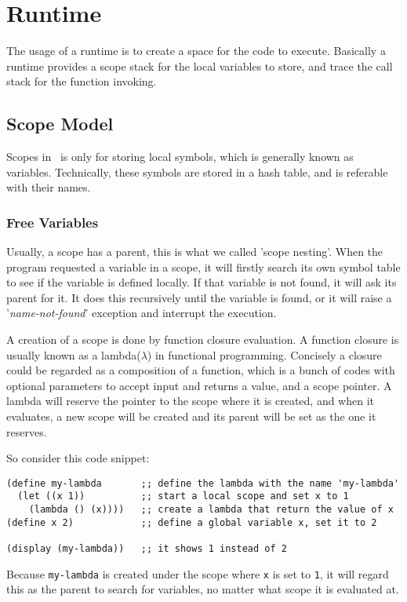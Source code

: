 \section{Runtime}
The usage of a runtime is to create a space for the code to
execute. Basically a runtime provides a scope stack for the local
variables to store, and trace the call stack for the function
invoking.

\subsection{Scope Model}
Scopes in \revo\ is only for storing local symbols, which is generally
known as variables. Technically, these symbols are stored in a hash
table, and is referable with their names.

\subsubsection{Free Variables}
Usually, a scope has a parent, this is what we called 'scope nesting'.
When the program requested a variable in a scope, it will firstly
search its own symbol table to see if the variable is defined
locally. If that variable is not found, it will ask its parent for
it. It does this recursively until the variable is found, or it will
raise a '\emph{name-not-found}' exception and interrupt the execution.

A creation of a scope is done by function closure evaluation. A
function closure is usually known as a lambda($\lambda$) in functional
programming. Concisely a closure could be regarded as a composition of
a function, which is a bunch of codes with optional parameters to
accept input and returns a value, and a scope pointer. A lambda will
reserve the pointer to the scope where it is created, and when it
evaluates, a new scope will be created and its parent will be set as
the one it reserves.

So consider this code snippet:
\begin{verbatim}
(define my-lambda       ;; define the lambda with the name 'my-lambda'
  (let ((x 1))          ;; start a local scope and set x to 1
    (lambda () (x))))   ;; create a lambda that return the value of x
(define x 2)            ;; define a global variable x, set it to 2

(display (my-lambda))   ;; it shows 1 instead of 2
\end{verbatim}

Because \verb+my-lambda+ is created under the scope where \verb+x+ is
set to \verb+1+, it will regard this as the parent to search for
variables, no matter what scope it is evaluated at.

